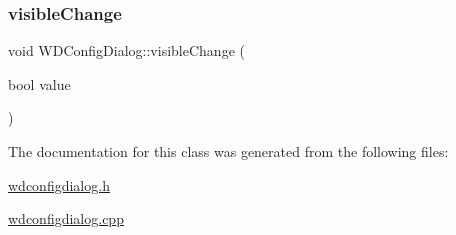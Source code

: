 \mbox{\label{class_w_d_config_dialog_a46e6c2574fc6de02a4219c24867c4c41}} 
\subsubsection{\texorpdfstring{visible\+Change}{visibleChange}}
{\footnotesize\ttfamily void W\+D\+Config\+Dialog\+::visible\+Change (\begin{DoxyParamCaption}\item[{bool}]{value }\end{DoxyParamCaption})\hspace{0.3cm}{\ttfamily [signal]}}



The documentation for this class was generated from the following files\+:\begin{DoxyCompactItemize}
\item 
\hyperlink{wdconfigdialog_8h}{wdconfigdialog.\+h}\item 
\hyperlink{wdconfigdialog_8cpp}{wdconfigdialog.\+cpp}\end{DoxyCompactItemize}
